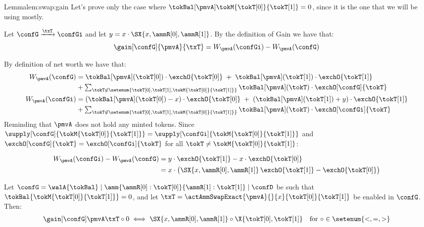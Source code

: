 \begin{proofof}{Lemma}{lem:swap:gain}
    Let's prove only the case where $\tokBal[\pmvA]\tokM{\tokT[0]}{\tokT[1]} = 0$, since it is the one that we will be using mostly. 

    Let $\confG \xrightarrow{\txT} \confGi$ and let $y = x \cdot \SX{x, \ammR[0], \ammR[1]}$. By the definition of Gain we have that: 
    \begin{equation}
        \gain[\confG]{\pmvA}{\txT} = W_{\pmvA}(\confGi) - W_{\pmvA}(\confG)
    \end{equation}

By definition of net worth we have that: 
    \begin{align*}
    W_{\pmvA}(\confG)
    & = \tokBal[\pmvA](\tokT[0]) \cdot \exchO{\tokT[0]}
      \; + \;
      \tokBal[\pmvA](\tokT[1]) \cdot \exchO{\tokT[1]}
    \\
    & +
      \textstyle \sum_{\tokT \not\in \setenum{\tokT[0],\tokT[1], \tokM{\tokT[0]}{\tokT[1]}}}
      \tokBal[\pmvA](\tokT) \cdot \exchO[\confG]{\tokT}
    \\
    W_{\pmvA}(\confGi)
    & = (\tokBal[\pmvA](\tokT[0]) - x) \cdot \exchO{\tokT[0]}
      \; + \;
      (\tokBal[\pmvA](\tokT[1]) + y) \cdot \exchO{\tokT[1]}
    \\
    & +
      \textstyle \sum_{\tokT \not\in \setenum{\tokT[0],\tokT[1], \tokM{\tokT[0]}{\tokT[1]}}}
      \tokBal[\pmvA](\tokT) \cdot \exchO[\confGi]{\tokT}
  \end{align*}
Reminding that $\pmvA$ does not hold any minted tokens. Since 
  $\supply[\confG]{\tokM{\tokT[0]}{\tokT[1]}} = \supply[\confGi]{\tokM{\tokT[0]}{\tokT[1]}}$
  and
  $\exchO[\confG]{\tokT} = \exchO[\confGi]{\tokT}$
  for all $\tokT \neq \tokM{\tokT[0]}{\tokT[1]}$:

  \begin{align*}
    W_{\pmvA}(\confGi) - W_{\pmvA}(\confG)
    & = y \cdot \exchO{\tokT[1]}
      - x \cdot \exchO{\tokT[0]}
    \\
    & =     x \cdot \big(
      \SX{x,\ammR[0],\ammR[1]} \, \exchO{\tokT[1]}
      -
      \exchO{\tokT[0]}
      \big)
  \end{align*}
\end{proofof}


\begin{lem}
  \label{lem:swap:gain-SX-X}
  Let $\confG = \walA{\tokBal} \mid \amm{\ammR[0]:\tokT[0]}{\ammR[1]:\tokT[1]} \mid \confD$ 
  be such that $\tokBal{\tokM{\tokT[0]}{\tokT[1]}} = 0$, and
  let $\txT = \actAmmSwapExact{\pmvA}{}{x}{\tokT[0]}{\tokT[1]}$ 
  be enabled in $\confG$.
  Then: 
  \begin{align*}
      \gain[{\confG}]{\pmvA}{\txT} \circ 0
      \iff
      \SX{x,\ammR[0],\ammR[1]} \circ \X{\tokT[0],\tokT[1]}
       && \text{for $\circ \in \setenum{<, =, >}$}
  \end{align*}
\end{lem}

